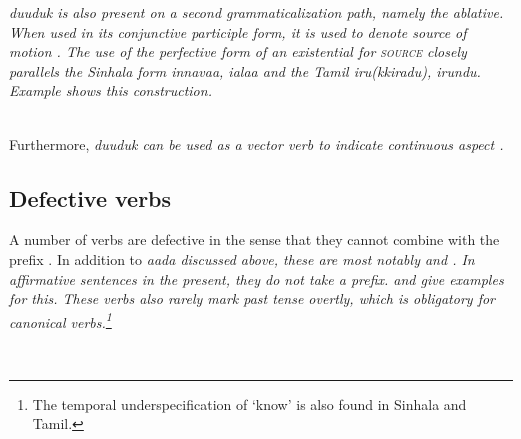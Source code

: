 
\em duuduk \em is also present on a second grammaticalization path, namely the ablative. When used in its conjunctive participle form, it is used to denote source of motion . The  use of the perfective form of an existential for \textsc{source} closely parallels the Sinhala form \em innavaa, i\und alaa \em and the Tamil \em iru(kkiradu), irundu. \em Example  shows this construction.

 \\
Furthermore, \em duuduk \em can be used as a vector verb to indicate continuous aspect .


\subsection{Defective verbs}\label{sec:wc:Defectiveverbs}
A number of verbs are defective in the sense that they cannot combine with the  prefix . In addition to \em aada \em discussed above, these are most notably  and . In affirmative sentences in the present, they do not take a prefix.  and  give examples for this. These verbs also rarely mark past tense overtly, which is obligatory for canonical verbs.\footnote{The temporal underspecification of `know' is also found in Sinhala   and Tamil.}






 \\



